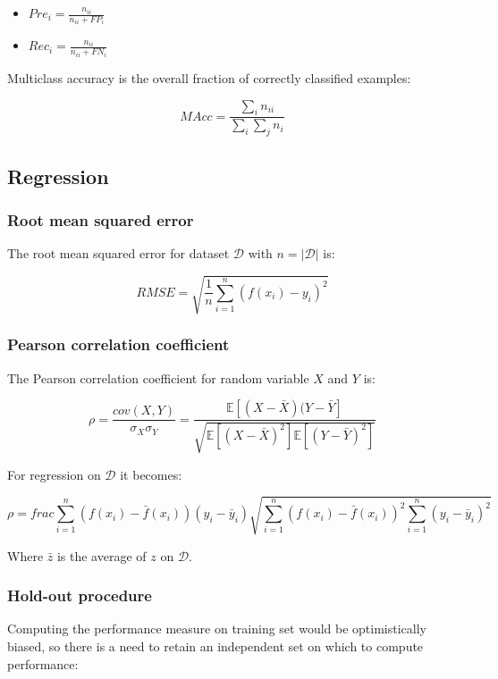 		\begin{multicols}{2}
			\begin{itemize}
				\item $Pre_i = \frac{n_{ii}}{n_{ii} + FP_i}$
				\item $Rec_i = \frac{n_{ii}}{n_{ii}+FN_i}$
			\end{itemize}
		\end{multicols}

		Multiclass accuracy is the overall fraction of correctly classified examples:

		$$MAcc = \frac{\sum\limits_i n_{ii}}{\sum\limits_i\sum\limits_j n_{i}}$$

	\subsection{Regression}
	
		\subsubsection{Root mean squared error}
		The root mean squared error for dataset $\mathcal{D}$ with $n = |\mathcal{D}|$ is:

		$$RMSE = \sqrt{\frac{1}{n}\sum\limits_{i=1}^n(f(x_i)-y_i)^2}$$

		\subsubsection{Pearson correlation coefficient}
		The Pearson correlation coefficient for random variable $X$ and $Y$ is:

		$$\rho = \frac{cov(X, Y)}{\sigma_X\sigma_Y} = \frac{\mathbb{E}[(X-\bar{X})(Y-\bar{Y}]}{\sqrt{\mathbb{E}[(X-\bar{X})^2]\mathbb{E}[(Y-\bar{Y})^2]}}$$

		For regression on $\mathcal{D}$ it becomes:

		$$\rho = frac{\sum\limits_{i=1}^n(f(x_i)-\bar{f}(x_i))(y_i-\bar{y}_i)}{\sqrt{\sum\limits_{i=1}^n(f(x_i)-\bar{f}(x_i))^2\sum\limits_{i=1}^n(y_i-\bar{y}_i)^2}}$$

		Where $\bar{z}$ is the average of $z$ on $\mathcal{D}$.

		\subsubsection{Hold-out procedure}
		Computing the performance measure on training set would be optimistically biased, so there is a need to retain an independent set on which to compute performance:

